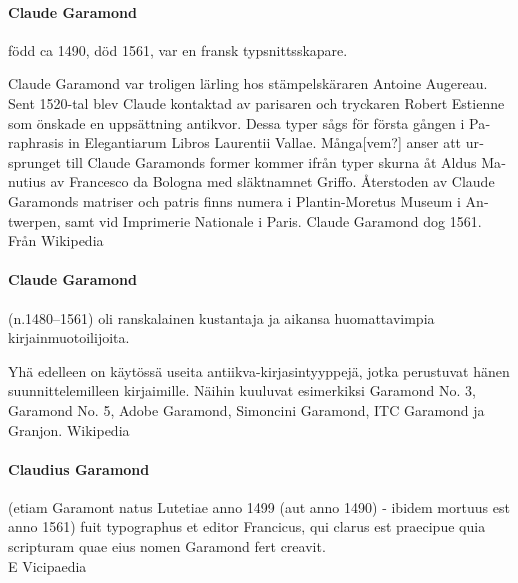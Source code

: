 \documentclass[pagesize,DIV14]{scrartcl}
\begin{document}
\begin{multicols}{2}
\begin{swedish}
\paragraph*{Claude Garamond} född ca 1490, död 1561, var en fransk typsnittsskapare.

Claude Garamond var troligen lärling hos stämpelskäraren Antoine Augereau. Sent 1520-tal blev Claude kontaktad av parisaren och tryckaren Robert Estienne som önskade en uppsättning antikvor. Dessa typer sågs för första gången i Paraphrasis in Elegantiarum Libros Laurentii Vallae. Många[vem?] anser att ursprunget till Claude Garamonds former kommer ifrån typer skurna åt Aldus Manutius av Francesco da Bologna med släktnamnet Griffo. Återstoden av Claude Garamonds matriser och patris finns numera i Plantin-Moretus Museum i Antwerpen, samt vid Imprimerie Nationale i Paris. Claude Garamond dog 1561.\\
{\scriptsize Från Wikipedia}
\end{swedish}

\begin{finnish}
\paragraph*{Claude Garamond} (n.1480–1561) oli ranskalainen kustantaja ja aikansa huomattavimpia kirjainmuotoilijoita.

Yhä edelleen on käytössä useita antiikva-kirjasintyyppejä, jotka perustuvat hänen suunnittelemilleen kirjaimille. Näihin kuuluvat esimerkiksi Garamond No. 3, Garamond No. 5, Adobe Garamond, Simoncini Garamond, ITC Garamond ja Granjon.
{\scriptsize Wikipedia}
\end{finnish}

\begin{latin}
\paragraph*{Claudius Garamond} (etiam Garamont natus Lutetiae anno 1499 (aut anno 1490) - ibidem mortuus est anno 1561) fuit typographus et editor Francicus, qui clarus est praecipue quia scripturam quae eius nomen Garamond fert creavit.\\
{\scriptsize E Vicipaedia}
\end{latin}


\end{multicols}
\end{document}
